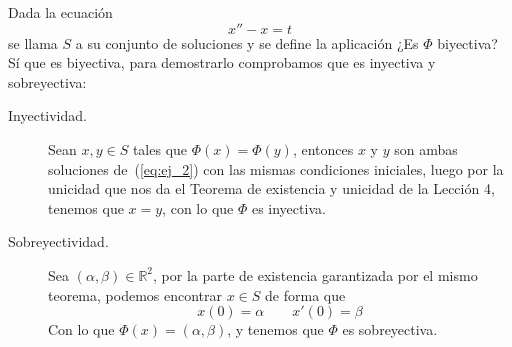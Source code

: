 \documentclass[12pt]{article}
\begin{document}
    \begin{ejercicio}
        Dada la ecuación
        \begin{equation}\label{eq:ej_2}
            x''-x=t
        \end{equation}
        se llama $S$ a su conjunto de soluciones y se define la aplicación
        ¿Es $\Phi$ biyectiva?\\

        \noindent
        Sí que es biyectiva, para demostrarlo comprobamos que es inyectiva y sobreyectiva:
        \begin{description}
            \item [Inyectividad.] Sean $x,y\in S$ tales que $\Phi(x) = \Phi(y)$, entonces $x$ y $y$ son ambas soluciones de~(\ref{eq:ej_2}) con las mismas condiciones iniciales, luego por la unicidad que nos da el Teorema de existencia y unicidad de la Lección 4, tenemos que $x=y$, con lo que $\Phi$ es inyectiva.
            \item [Sobreyectividad.] Sea $(\alpha,\beta)\in \mathbb{R}^2$, por la parte de existencia garantizada por el mismo teorema, podemos encontrar $x\in S$ de forma que
                \begin{equation*}
                    x(0) = \alpha \qquad x'(0) = \beta
                \end{equation*}
                Con lo que $\Phi(x)=(\alpha,\beta)$, y tenemos que $\Phi$ es sobreyectiva.
        \end{description}
    \end{ejercicio}
\end{document}
